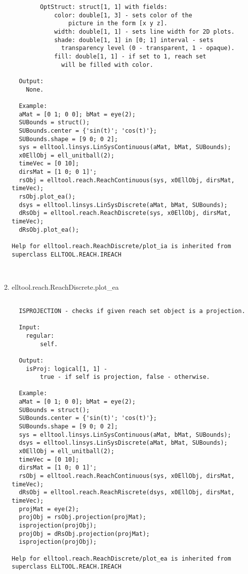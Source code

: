 \begin{enumerate}
\begin{lstlisting}
        OptStruct: struct[1, 1] with fields:
            color: double[1, 3] - sets color of the
                picture in the form [x y z].
            width: double[1, 1] - sets line width for 2D plots.
            shade: double[1, 1] in [0; 1] interval - sets
              transparency level (0 - transparent, 1 - opaque).
            fill: double[1, 1] - if set to 1, reach set
              will be filled with color.

  Output:
    None.

  Example:
  aMat = [0 1; 0 0]; bMat = eye(2);
  SUBounds = struct();
  SUBounds.center = {'sin(t)'; 'cos(t)'};
  SUBounds.shape = [9 0; 0 2];
  sys = elltool.linsys.LinSysContinuous(aMat, bMat, SUBounds);
  x0EllObj = ell_unitball(2);
  timeVec = [0 10];
  dirsMat = [1 0; 0 1]';
  rsObj = elltool.reach.ReachContinuous(sys, x0EllObj, dirsMat, timeVec);
  rsObj.plot_ea();
  dsys = elltool.linsys.LinSysDiscrete(aMat, bMat, SUBounds);
  dRsObj = elltool.reach.ReachDiscrete(sys, x0EllObj, dirsMat, timeVec);
  dRsObj.plot_ea();

Help for elltool.reach.ReachDiscrete/plot_ia is inherited from superclass ELLTOOL.REACH.IREACH



\end{lstlisting}
\fontfamily{\familydefault}
\selectfont
\item {elltool.reach.ReachDiscrete.plot\_ea}
\selectfont
\begin{lstlisting}

  ISPROJECTION - checks if given reach set object is a projection.

  Input:
    regular:
        self.

  Output:
    isProj: logical[1, 1] -
        true - if self is projection, false - otherwise.

  Example:
  aMat = [0 1; 0 0]; bMat = eye(2);
  SUBounds = struct();
  SUBounds.center = {'sin(t)'; 'cos(t)'};
  SUBounds.shape = [9 0; 0 2];
  sys = elltool.linsys.LinSysContinuous(aMat, bMat, SUBounds);
  dsys = elltool.linsys.LinSysDiscrete(aMat, bMat, SUBounds);
  x0EllObj = ell_unitball(2);
  timeVec = [0 10];
  dirsMat = [1 0; 0 1]';
  rsObj = elltool.reach.ReachContinuous(sys, x0EllObj, dirsMat, timeVec);
  dRsObj = elltool.reach.ReachRiscrete(dsys, x0EllObj, dirsMat, timeVec);
  projMat = eye(2);
  projObj = rsObj.projection(projMat);
  isprojection(projObj);
  projObj = dRsObj.projection(projMat);
  isprojection(projObj);

Help for elltool.reach.ReachDiscrete/plot_ea is inherited from superclass ELLTOOL.REACH.IREACH




\end{lstlisting}
\end{enumerate}
